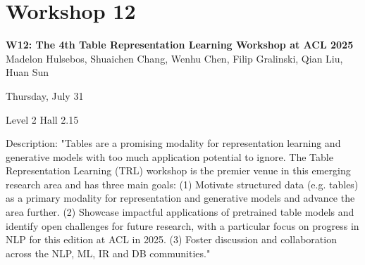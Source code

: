 \clearpage



\section[W12: The 4th Table Representation Learning Workshop at ACL 2025]{Workshop 12}
\label{workshop_12}

\begin{center}
    {\Large \textbf{W12: The 4th Table Representation Learning Workshop at ACL 2025}}\\
    

   Madelon Hulsebos, Shuaichen Chang, Wenhu Chen, Filip Gralinski, Qian Liu, Huan Sun

    Thursday, July 31
    
   Level 2 Hall 2.15

\end{center}

Description: "Tables are a promising modality for representation learning and generative models with too much application potential to ignore. The Table Representation Learning (TRL) workshop is the premier venue in this emerging research area and has three main goals:
(1) Motivate structured data (e.g. tables) as a primary modality for representation and generative models and advance the area further.
(2) Showcase impactful applications of pretrained table models and identify open challenges for future research, with a particular focus on progress in NLP for this edition at ACL in 2025.
(3) Foster discussion and collaboration across the NLP, ML, IR and DB communities."


